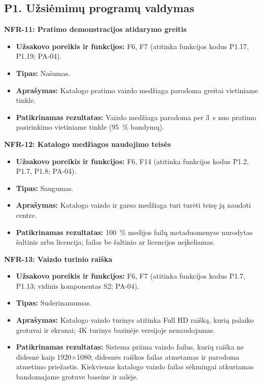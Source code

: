 \subsection{P1. Užsiėmimų programų valdymas}

\noindent\textbf{NFR-11: Pratimo demonstracijos atidarymo greitis}
\begin{itemize}
    \item \textbf{Užsakovo poreikis ir funkcijos:} F6, F7 (atitinka funkcijos kodus P1.17, P1.19; PA-04).
    \item \textbf{Tipas:} Našumas.
    \item \textbf{Aprašymas:} Katalogo pratimo vaizdo medžiaga parodoma greitai vietiniame tinkle.
    \item \textbf{Patikrinamas rezultatas:} Vaizdo medžiaga parodoma per 3~s nuo pratimo pasirinkimo vietiniame tinkle (95~\% bandymų).
\end{itemize}

\noindent\textbf{NFR-12: Katalogo medžiagos naudojimo teisės}
\begin{itemize}
    \item \textbf{Užsakovo poreikis ir funkcijos:} F6, F14 (atitinka funkcijos kodus P1.2, P1.7, P1.8; PA-04).
    \item \textbf{Tipas:} Saugumas.
    \item \textbf{Aprašymas:} Katalogo vaizdo ir garso medžiaga turi turėti teisę ją naudoti centre.
    \item \textbf{Patikrinamas rezultatas:} 100~\% medijos failų metaduomenyse nurodytas šaltinis arba licencija; failas be šaltinio ar licencijos neįkeliamas.
\end{itemize}

\noindent\textbf{NFR-13: Vaizdo turinio raiška}
\begin{itemize}
    \item \textbf{Užsakovo poreikis ir funkcijos:} F6, F7 (atitinka funkcijos kodus P1.7, P1.13; vidinis komponentas S2; PA-04).
    \item \textbf{Tipas:} Suderinamumas.
    \item \textbf{Aprašymas:} Katalogo vaizdo turinys atitinka Full HD raišką, kurią palaiko grotuvai ir ekranai; 4K turinys bazinėje versijoje nenaudojamas.
    \item \textbf{Patikrinamas rezultatas:} Sistema priima vaizdo failus, kurių raiška ne didesnė kaip 1920$\times$1080; didesnės raiškos failas atmetamas ir parodoma atmetimo priežastis. Kiekvienas katalogo vaizdo failas sėkmingai atkuriamas bandomajame grotuve baseine ir salėje.
\end{itemize}

